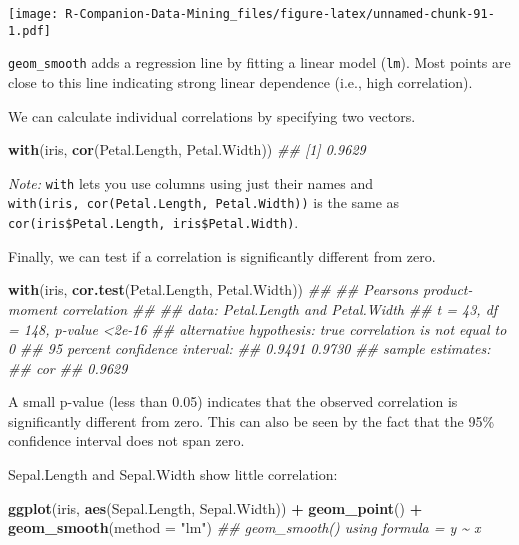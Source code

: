 \documentclass[
  notitlepage]{book}
\newenvironment{Shaded}{\begin{snugshade}}{\end{snugshade}}
\newcommand{\CommentTok}[1]{\textcolor[rgb]{0.56,0.35,0.01}{\textit{#1}}}
\newcommand{\DataTypeTok}[1]{\textcolor[rgb]{0.13,0.29,0.53}{#1}}
\newcommand{\KeywordTok}[1]{\textcolor[rgb]{0.13,0.29,0.53}{\textbf{#1}}}
\newcommand{\NormalTok}[1]{#1}
\newcommand{\OperatorTok}[1]{\textcolor[rgb]{0.81,0.36,0.00}{\textbf{#1}}}
\newcommand{\StringTok}[1]{\textcolor[rgb]{0.31,0.60,0.02}{#1}}
\begin{document}
\texttt{[image: R-Companion-Data-Mining\_files/figure-latex/unnamed-chunk-91-1.pdf]}

\texttt{geom\_smooth} adds a regression line by fitting a linear model (\texttt{lm}).
Most points are close to this line indicating strong linear dependence
(i.e., high correlation).

We can calculate individual correlations by specifying two vectors.

\begin{Shaded}
\begin{Highlighting}[]
\KeywordTok{with}\NormalTok{(iris, }\KeywordTok{cor}\NormalTok{(Petal.Length, Petal.Width))}
\CommentTok{\#\# [1] 0.9629}
\end{Highlighting}
\end{Shaded}

\emph{Note:} \texttt{with} lets you use columns using just their names and
\texttt{with(iris,\ cor(Petal.Length,\ Petal.Width))} is the same as
\texttt{cor(iris\$Petal.Length,\ iris\$Petal.Width)}.

Finally, we can test if a correlation is significantly different from
zero.

\begin{Shaded}
\begin{Highlighting}[]
\KeywordTok{with}\NormalTok{(iris, }\KeywordTok{cor.test}\NormalTok{(Petal.Length, Petal.Width))}
\CommentTok{\#\# }
\CommentTok{\#\#  Pearson\textquotesingle{}s product{-}moment correlation}
\CommentTok{\#\# }
\CommentTok{\#\# data:  Petal.Length and Petal.Width}
\CommentTok{\#\# t = 43, df = 148, p{-}value \textless{}2e{-}16}
\CommentTok{\#\# alternative hypothesis: true correlation is not equal to 0}
\CommentTok{\#\# 95 percent confidence interval:}
\CommentTok{\#\#  0.9491 0.9730}
\CommentTok{\#\# sample estimates:}
\CommentTok{\#\#    cor }
\CommentTok{\#\# 0.9629}
\end{Highlighting}
\end{Shaded}

A small p-value (less than 0.05) indicates that the observed correlation
is significantly different from zero. This can also be seen by the fact
that the 95\% confidence interval does not span zero.

Sepal.Length and Sepal.Width show little correlation:

\begin{Shaded}
\begin{Highlighting}[]
\KeywordTok{ggplot}\NormalTok{(iris, }\KeywordTok{aes}\NormalTok{(Sepal.Length, Sepal.Width)) }\OperatorTok{+}\StringTok{ }
\StringTok{  }\KeywordTok{geom\_point}\NormalTok{() }\OperatorTok{+}\StringTok{   }
\StringTok{  }\KeywordTok{geom\_smooth}\NormalTok{(}\DataTypeTok{method =} \StringTok{"lm"}\NormalTok{) }
\CommentTok{\#\# \textasciigrave{}geom\_smooth()\textasciigrave{} using formula = \textquotesingle{}y \textasciitilde{} x\textquotesingle{}}
\end{Highlighting}
\end{Shaded}
\end{document}
